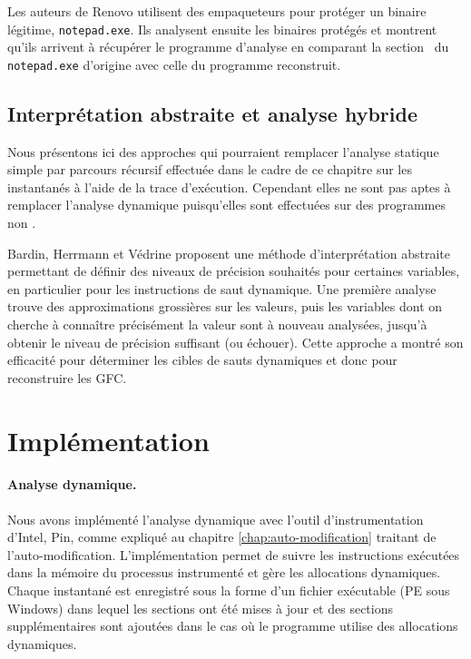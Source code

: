 Les auteurs de Renovo utilisent des empaqueteurs pour protéger un binaire légitime, \texttt{notepad.exe}. Ils analysent ensuite les binaires protégés et montrent qu'ils arrivent à récupérer le programme d'analyse en comparant la section \ptext\ du \texttt{notepad.exe} d'origine avec celle du programme reconstruit.


\subsection{Interprétation abstraite et analyse hybride}
Nous présentons ici des approches qui pourraient remplacer l'analyse statique simple par parcours récursif effectuée dans le cadre de ce chapitre sur les instantanés à l'aide de la trace d'exécution. Cependant elles ne sont pas aptes à remplacer l'analyse dynamique puisqu'elles sont effectuées sur des programmes non \sms.


Bardin, Herrmann et Védrine \cite{BHV11} proposent une méthode d'interprétation abstraite permettant de définir des niveaux de précision souhaités pour certaines variables, en particulier pour les instructions de saut dynamique. 
Une première analyse trouve des approximations grossières sur les valeurs, puis les variables dont on cherche à connaître précisément la valeur sont à nouveau analysées, jusqu'à obtenir le niveau de précision suffisant (ou échouer).
Cette approche a montré son efficacité pour déterminer les cibles de sauts dynamiques et donc pour reconstruire les GFC.


\section{Implémentation}
\paragraph{Analyse dynamique.}
Nous avons implémenté l'analyse dynamique avec l'outil d'instrumentation d'Intel, Pin, comme expliqué au chapitre \ref{chap:auto-modification} traitant de l'auto-modification.
L'implémentation permet de suivre les instructions exécutées dans la mémoire du processus instrumenté et gère les allocations dynamiques.
Chaque instantané est enregistré sous la forme d'un fichier exécutable (PE sous Windows) dans lequel les sections ont été mises à jour et des sections supplémentaires sont ajoutées dans le cas où le programme utilise des allocations dynamiques.

